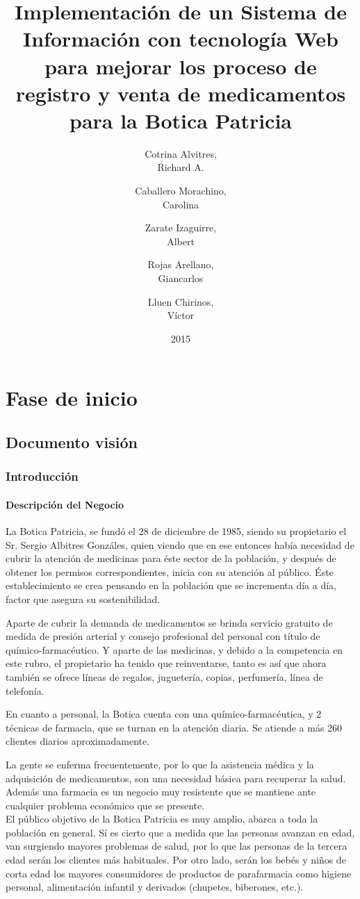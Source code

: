 \documentclass[a4paper,11pt, spanish]{report}
\title{\Huge \textbf{Implementación de un Sistema de Información con tecnología Web para mejorar los proceso de registro y venta de medicamentos para la Botica Patricia\\[3em]}}
\author{
  \Large Cotrina Alvitres,\\
  Richard A.\\[2em]
  \and
  \Large Caballero Morachino,\\
  Carolina\\[2em]
  \and
  \Large Zarate Izaguirre, \\
  Albert\\[2em]
  \and
  \Large Rojas Arellano, \\
  Giancarlos\\[2em]
  \and
  \Large Lluen Chirinos, \\
  Víctor\\[2em]
}
\date{\LARGE 2015}
\begin{document}
\maketitle

\tableofcontents
\listoftables
\listoffigures

\part{Fase de inicio}
  \chapter{Documento visión}
    \section{Introducción}
      \subsection{Descripción del Negocio}
        La Botica Patricia, se fundó el 28 de diciembre de 1985, siendo su propietario el Sr. Sergio Albitres Gonzáles, quien viendo que en ese entonces había necesidad de cubrir la atención de medicinas para éste sector de la población, y después de obtener los permisos correspondientes, inicia con su atención al público.
Éste establecimiento se crea pensando en la población que se incrementa día a día, factor que asegura su sostenibilidad.

Aparte de cubrir la demanda de medicamentos se brinda servicio gratuito de medida de presión arterial y consejo profesional del personal con título de químico-farmacéutico. Y aparte de las medicinas, y debido a la competencia en este rubro, el propietario ha tenido que reinventarse, tanto es así que ahora también se ofrece líneas de regalos, juguetería, copias, perfumería, línea de telefonía.

En cuanto a personal, la Botica cuenta con una químico-farmacéutica, y 2 técnicas de farmacia, que se turnan en la atención diaria. Se atiende a más 260 clientes diarios aproximadamente.

La gente se enferma frecuentemente, por lo que la asistencia médica y la adquisición de medicamentos, son una necesidad básica para recuperar la salud. Además una farmacia es un negocio muy resistente que se mantiene ante cualquier problema económico que se presente. \\
El público objetivo de la Botica Patricia es muy amplio, abarca a toda la población en general. Sí es cierto que a medida que las personas avanzan en edad, van surgiendo mayores problemas de salud, por lo que las personas de la tercera edad serán los clientes más habituales.
Por otro lado, serán los bebés y niños de corta edad los mayores consumidores de productos de parafarmacia como higiene personal, alimentación infantil y derivados (chupetes, biberones, etc.).
\end{document}
